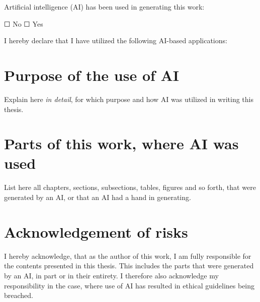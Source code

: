 Artificial intelligence (AI) has been used in generating this work:

☐  No
☐  Yes

I hereby declare that I have utilized the following AI-based applications:

\begin{center}
\end{center}

\section*{Purpose of the use of AI}

Explain here \emph{in detail}, for which purpose and how AI was utilized in writing this thesis.

\section*{Parts of this work,  where AI was used}

List here all chapters, sections, subsections, tables, figures and so forth,
that were generated by an AI, or that an AI had a hand in generating.

\section*{Acknowledgement of risks}

I hereby acknowledge, that as the author of this work, I am fully responsible
for the contents presented in this thesis. This includes the parts that were
generated by an AI, in part or in their entirety. I therefore also acknowledge
my responsibility in the case, where use of AI has resulted in ethical
guidelines being breached.

